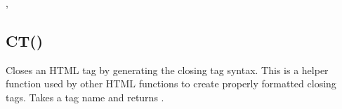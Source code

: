 \documentclass[letterpaper,10pt,english]{sphinxmanual}
\begin{document}
\sphinxAtStartPar
{}

\begin{sphinxVerbatim}[commandchars=\\\{\}]
\end{sphinxVerbatim}

\sphinxAtStartPar
{}

\begin{sphinxVerbatim}[commandchars=\\\{\}]
\end{sphinxVerbatim}

\sphinxAtStartPar
{}

\sphinxAtStartPar
{}, 

\ignorespaces 

\subsection{CT()}
\label{\detokenize{reference/html:ct}}\label{\detokenize{reference/html:index-2}}
\sphinxAtStartPar
{}

\sphinxAtStartPar
Closes an HTML tag by generating the closing tag syntax. This is a helper function used by other HTML functions to create properly formatted closing tags. Takes a tag name and returns .

\sphinxAtStartPar
{}

\begin{sphinxVerbatim}[commandchars=\\\{\}]
\end{sphinxVerbatim}

\sphinxAtStartPar
{}

\begin{sphinxVerbatim}[commandchars=\\\{\}]
\end{sphinxVerbatim}
\end{document}
